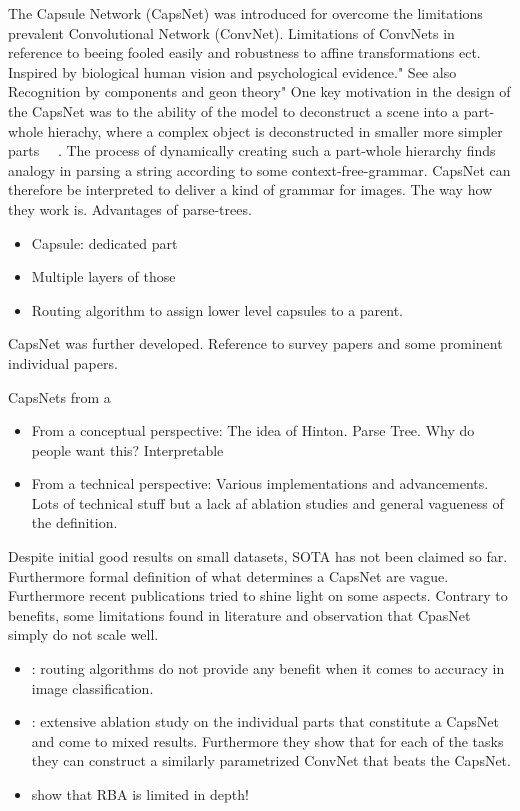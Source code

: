 \documentclass{article}
\begin{document}
The Capsule Network (CapsNet) \cite{nips/SabourFH17} was introduced for overcome the limitations prevalent Convolutional Network (ConvNet).
Limitations of ConvNets in reference to beeing fooled easily and robustness to affine transformations ect.
Inspired by biological human vision and psychological evidence." See also Recognition by components and geon theory"
One key motivation in the design of the CapsNet was to the ability of the model to deconstruct a scene into a part-whole hierachy, where a complex object is deconstructed in smaller more simpler parts ~\cite{nips/SabourFH17}~\cite{corr/Hinton2021}. The process of dynamically creating such a part-whole hierarchy finds analogy in parsing a string according to some context-free-grammar. CapsNet can therefore be interpreted to deliver a kind of grammar for images. The way how they work is.
Advantages of parse-trees.
\begin{itemize}
	\item Capsule: dedicated part
	\item Multiple layers of those
	\item Routing algorithm to assign lower level capsules to a parent.
\end{itemize}
CapsNet was further developed.
Reference to survey papers and some prominent individual papers.

CapsNets from a
\begin{itemize}
	\item From a conceptual perspective: The idea of Hinton. Parse Tree. Why do people want this? Interpretable
	\item From a technical perspective: Various implementations and advancements. Lots of technical stuff but a lack af ablation studies and general vagueness of the definition.
\end{itemize}

Despite initial good results on small datasets, SOTA has not been claimed so far. Furthermore formal definition of what determines a CapsNet are vague.
Furthermore recent publications tried to shine light on some aspects.
Contrary to benefits, some limitations found in literature and observation that CpasNet simply do not scale well.
\begin{itemize}
	\item \cite{acml/PaikKK19}: routing algorithms do not provide any benefit when it comes to accuracy in image classification.
	\item \cite{cvpr/GuT021}: extensive ablation study on the individual parts that constitute a CapsNet and come to mixed results. Furthermore they show that for each of the tasks they can construct a similarly parametrized ConvNet that beats the CapsNet.
	\item \cite{prl/PeerSR21} show that RBA is limited in depth!
\end{itemize}
\end{document}
